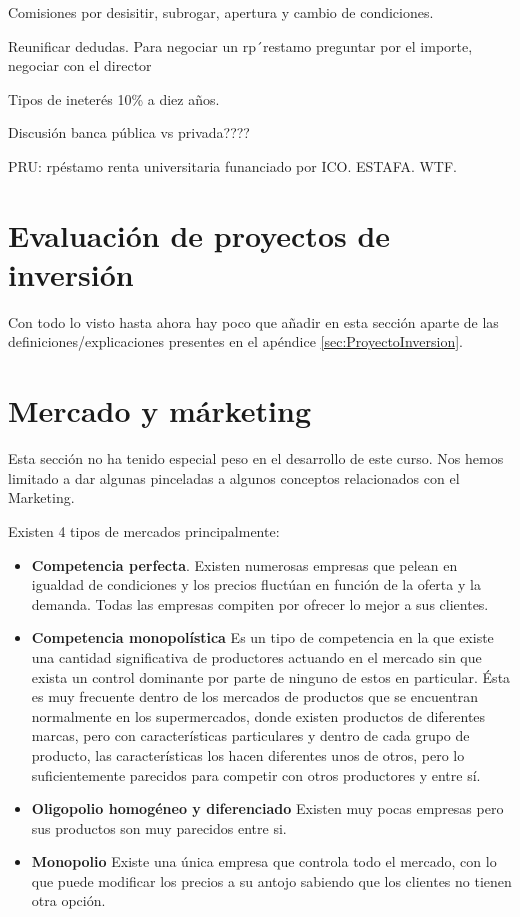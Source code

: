 \documentclass[nochap,palatino,shortheader]{apuntes}
\begin{document}
Comisiones por desisitir, subrogar, apertura y cambio de condiciones.

Reunificar dedudas. Para negociar un rp´restamo preguntar por el importe, negociar con el director

Tipos de ineterés 10\% a diez años.

Discusión banca pública vs privada????

PRU: rpéstamo renta universitaria funanciado por ICO. ESTAFA. WTF.

\section{Evaluación de proyectos de inversión}
Con todo lo visto hasta ahora hay poco que añadir en esta sección aparte de las definiciones/explicaciones presentes en el apéndice \ref{sec:ProyectoInversion}.

\section{Mercado y márketing}

Esta sección no ha tenido especial peso en el desarrollo de este curso. Nos hemos limitado a dar algunas pinceladas a algunos conceptos relacionados con el Marketing.

Existen 4 tipos de mercados principalmente:
\begin{itemize}
\item \textbf{Competencia perfecta}. Existen numerosas empresas que pelean en igualdad de condiciones y los precios fluctúan en función de la oferta y la demanda. Todas las empresas compiten por ofrecer lo mejor a sus clientes.

\item \textbf{Competencia monopolística}
Es un tipo de competencia en la que existe una cantidad significativa de productores actuando en el mercado sin que exista un control dominante por parte de ninguno de estos en particular. Ésta es muy frecuente dentro de los mercados de productos que se encuentran normalmente en los supermercados, donde existen productos de diferentes marcas, pero con características particulares y dentro de cada grupo de producto, las características los hacen diferentes unos de otros, pero lo suficientemente parecidos para competir con otros productores y entre sí.
\item \textbf{Oligopolio homogéneo y diferenciado}
Existen muy pocas empresas pero sus productos son muy parecidos entre si.
\item \textbf{Monopolio}
Existe una única empresa que controla todo el mercado, con lo que puede modificar los precios a su antojo sabiendo que los clientes no tienen otra opción.
\end{itemize}
\end{document}
